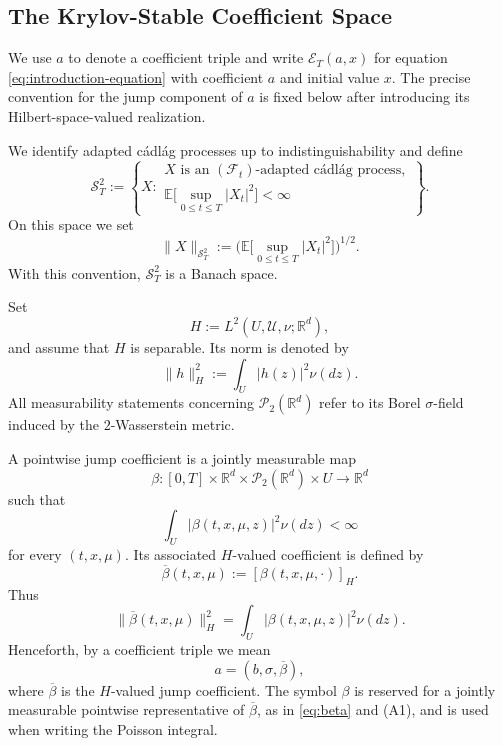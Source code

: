 \documentclass[12pt,oneside, reqno]{amsart}
\numberwithin{equation}{section}
\begin{document}
	\subsection{The Krylov-Stable Coefficient Space}
	
	We use $a$ to denote a coefficient triple and write
	$\mathcal E_T(a,x)$ for equation \eqref{eq:introduction-equation}
	with coefficient $a$ and initial value $x$. The precise convention for
	the jump component of $a$ is fixed below after introducing its
	Hilbert-space-valued realization.
	
	We identify adapted c\'adl\'ag processes up to
	indistinguishability and define
	\[
	\mathcal S_T^2
	:=
	\left\{
	X:
	\begin{array}{l}
		X \text{ is an }(\mathcal F_t)\text{-adapted c\'adl\'ag process},\\[1mm]
		\displaystyle
		\mathbb E\big[\sup_{0\leq t\leq T}|X_t|^2\big]<\infty
	\end{array}
	\right\}.
	\]
	On this space we set
	\[
	\|X\|_{\mathcal S_T^2}
	:=
	\bigg(
	\mathbb E\big[\sup_{0\leq t\leq T}|X_t|^2\big]
	\bigg)^{1/2}.
	\]
	With this convention, $\mathcal S_T^2$ is a Banach space.
	
	
	
	
	Set
	\begin{equation}
		\label{eq:H}
		H:=L^2(U,\mathcal U,\nu;\mathbb R^d),
	\end{equation}
	and assume that $H$ is separable. Its norm is denoted by
	\[
	\|h\|_H^2 := \int_U |h(z)|^2 \nu(dz).
	\]
	All measurability statements concerning $\mathcal P_2(\mathbb R^d)$ refer to its Borel $\sigma$-field induced by the $2$-Wasserstein metric.
	
	A pointwise jump coefficient is a jointly measurable map
	\[
	\beta: [0,T]\times\mathbb R^d \times \mathcal P_2(\mathbb R^d)\times U \longrightarrow \mathbb R^d
	\]
	such that
	\[
	\int_U |\beta(t,x,\mu,z)|^2 \nu(dz) < \infty
	\]
	for every $(t,x,\mu)$. Its associated $H$-valued coefficient is defined by
	\begin{equation}
		\label{eq:beta}
		\overline{\beta}(t,x,\mu) := [\beta(t,x,\mu,\cdot)]_H.
	\end{equation}
	Thus
	\[
	\|\overline{\beta}(t,x,\mu)\|_H^2 = \int_U |\beta(t,x,\mu,z)|^2 \nu(dz).
	\]
	Henceforth, by a coefficient triple we mean
	\[
	a=(b,\sigma,\overline\beta),
	\]
	where $\overline\beta$ is the $H$-valued jump coefficient. The symbol
	$\beta$ is reserved for a jointly measurable pointwise representative
	of $\overline\beta$, as in \eqref{eq:beta} and \textnormal{(A1)}, and is
	used when writing the Poisson integral.
	
\end{document}

